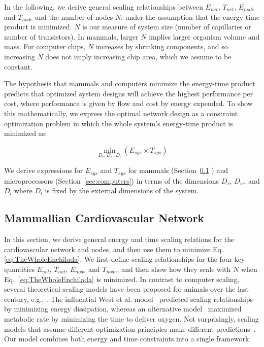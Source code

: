 \documentclass[12pt]{article}
\begin{document}
In the following, we derive general scaling relationships between $E_{net}$,
$T_{net}$, $E_{node}$ and $T_{node}$ and the number of nodes $N$, under the assumption that the energy-time product is minimized.  $N$ is our
measure of system size (number of capillaries or number of transistors). In mammals, larger $N$
implies larger organism volume and mass. For computer chips, $N$ increases by
shrinking components, and so increasing $N$ does not imply increasing chip
area, which we assume to be constant.

The hypothesis that mammals and computers minimize the energy-time product
predicts that optimized system designs will achieve
the highest performance per cost, where performance is given by flow and cost
by energy expended.  To show this mathematically, 
we express the optimal network design as a constraint optimization problem in
which the whole system's energy-time product is minimized as:

\begin{equation}
  \min_{D_r,D_w,D_l}(E_{sys} \times T_{sys})
\label{eq:TheWholeEnchilada}
\end{equation}

\noindent We derive expressions for $E_{sys}$ and $T_{sys}$ for mammals
(Section~\ref{sec:mammals} ) and microprocessors (Section~\ref{sec:computers}) in terms of
the dimensions $D_r$, $D_w$, and $D_l$ where $D_l$ is fixed by the external
dimensions of the system.


\subsection{Mammallian Cardiovascular Network}
\label{sec:mammals}

In this section, we derive general energy and time scaling relations for the cardiovascular
network and nodes, and then use them to minimize Eq.
\ref{eq:TheWholeEnchilada}.  We first define scaling relationships for the four
key quantities $E_{net}$, $T_{net}$, $E_{node}$ and $T_{node}$, and
then show
how they scale with $N$ when Eq.~\ref{eq:TheWholeEnchilada} is minimized.
In contrast to computer scaling, several theoretical scaling models have been proposed for animals over the last century, e.g., \cite{thompson1942arcy, west97, banavar1999size, dodds2010optimal, banavar10}. The influential West et al. model~\cite{west97} predicted
scaling relationships by minimizing energy dissipation,
whereas an alternative model~\cite{banavar10} maximized metabolic rate by minimizing the time to deliver oxygen. Not surprisingly, scaling models that assume different optimization principles make different predictions~\cite{newberry2015testing}.  Our model
combines both energy and time constraints into a single framework.
\end{document}
